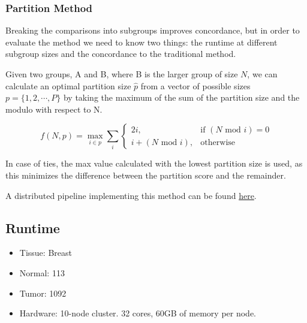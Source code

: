 \documentclass{article}
\providecommand{\tightlist}{%
      \setlength{\itemsep}{0pt}\setlength{\parskip}{0pt}}
\begin{document}
\subsubsection{Partition Method}\label{partition-method}

Breaking the comparisons into subgroups improves concordance, but in
order to evaluate the method we need to know two things: the runtime at
different subgroup sizes and the concordance to the traditional method.

Given two groups, A and B, where B is the larger group of size \(N\), we
can calculate an optimal partition size \(\hat{p}\) from a vector of
possible sizes \(p = \{1, 2, \cdots , P\}\) by taking the maximum of the
sum of the partition size and the modulo with respect to N.

\[
f(N, p)= \max_{i \in p} \sum_i
\begin{cases}
    2i,& \text{if } (N \mbox{ mod } i) = 0\\
    i + (N \mbox{ mod } i) ,              & \text{otherwise}
\end{cases}
\]

In case of ties, the max value calculated with the lowest partition size
is used, as this minimizes the difference between the partition score
and the remainder.

A distributed pipeline implementing this method can be found
\href{https://github.com/jvivian/rnaseq-recompute-analysis/blob/master/toil_pipelines/pairwise_chunk.py}{here}.

    \subsection{Runtime}\label{runtime}

\begin{itemize}
\tightlist
\item
  Tissue: Breast
\item
  Normal: 113
\item
  Tumor: 1092
\item
  Hardware: 10-node cluster. 32 cores, 60GB of memory per node.
\end{itemize}
\end{document}

